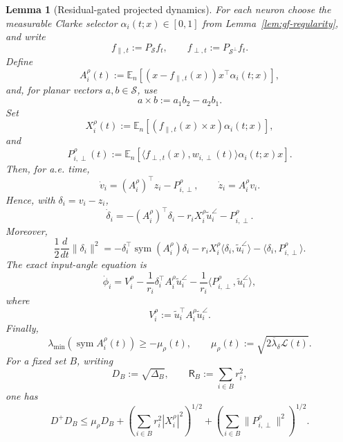 \documentclass{article} %
\theoremstyle{plain}
\newtheorem{lemma}[theorem]{Lemma}
\theoremstyle{definition}
\theoremstyle{remark}
\begin{document}
\begin{lemma}[Residual-gated projected dynamics]
\label{lem:residual-gated-mismatch}
For each neuron choose the measurable Clarke selector
$\alpha_i(t;x)\in[0,1]$ from Lemma~\ref{lem:gf-regularity}, and write
\[
f_{\parallel,t}:=P_{\mathcal S}f_t,
\qquad
f_{\perp,t}:=P_{\mathcal S^\perp}f_t.
\]
Define
\[
\boxed{
A_i^\rho(t)
:=
\mathbb E_n
\left[
(x-f_{\parallel,t}(x))x^\top\alpha_i(t;x)
\right],
}
\]
and, for planar vectors $a,b\in\mathcal S$, use
\[
a\times b:=a_1b_2-a_2b_1.
\]
Set
\[
\boxed{
X_i^\rho(t)
:=
\mathbb E_n
\left[
(f_{\parallel,t}(x)\times x)\alpha_i(t;x)
\right],
}
\]
and
\[
\boxed{
P_{i,\perp}^\rho(t)
:=
\mathbb E_n
\left[
\langle f_{\perp,t}(x),w_{i,\perp}(t)\rangle
\alpha_i(t;x)x
\right].
}
\]
Then, for a.e. time,
\[
\boxed{
\dot v_i
=
(A_i^\rho)^\top z_i
-
P_{i,\perp}^\rho,
\qquad
\dot z_i
=
A_i^\rho v_i.
}
\tag{residual-gated-cartesian}\label{eq:residual-gated-cartesian}
\]
Hence, with $\delta_i=v_i-z_i$,
\[
\boxed{
\dot\delta_i
=
-(A_i^\rho)^\top\delta_i
-
r_iX_i^\rho\widetilde u_i^\angle
-
P_{i,\perp}^\rho.
}
\tag{residual-gated-mismatch}\label{eq:residual-gated-mismatch}
\]
Moreover,
\[
\boxed{
\frac12\frac d{dt}\|\delta_i\|^2
=
-\delta_i^\top\operatorname{sym}(A_i^\rho)\delta_i
-r_iX_i^\rho
\langle\delta_i,\widetilde u_i^\angle\rangle
-\langle\delta_i,P_{i,\perp}^\rho\rangle.
}
\tag{mismatch-energy}\label{eq:mismatch-energy}
\]
The exact input-angle equation is
\[
\boxed{
\dot\phi_i
=
V_i^\rho
-
\frac1{r_i}
\delta_i^\top A_i^\rho\widetilde u_i^\angle
-
\frac1{r_i}
\langle P_{i,\perp}^\rho,\widetilde u_i^\angle\rangle,
}
\tag{residual-gated-angle}\label{eq:residual-gated-angle}
\]
where
\[
\boxed{
V_i^\rho
:=
\widetilde u_i^\top A_i^\rho\widetilde u_i^\angle.
}
\]
Finally,
\[
\boxed{
\lambda_{\min}
(\operatorname{sym}A_i^\rho(t))
\ge
-\mu_\rho(t),
\qquad
\mu_\rho(t)
:=
\sqrt{2\overline\lambda_\delta\mathcal L(t)}.
}
\tag{sym-lower}\label{eq:sym-lower}
\]
For a fixed set $B$, writing
\[
D_B:=\sqrt{\Delta_B},
\qquad
\mathsf R_B:=\sum_{i\in B}r_i^2,
\]
one has
\[
\boxed{
D^+D_B
\le
\mu_\rho D_B
+
\left(
\sum_{i\in B}r_i^2|X_i^\rho|^2
\right)^{1/2}
+
\left(
\sum_{i\in B}\|P_{i,\perp}^\rho\|^2
\right)^{1/2}.
}
\tag{mismatch-aggregate}\label{eq:mismatch-aggregate}
\]
\end{lemma}
\end{document}
